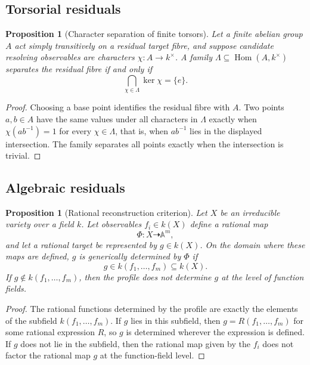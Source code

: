 \documentclass[11pt]{article}
\newtheorem{proposition}[theorem]{Proposition}
\theoremstyle{definition}
\theoremstyle{remark}
\begin{document}
\subsection{Torsorial residuals}

\begin{proposition}[Character separation of finite torsors]
Let a finite abelian group \(A\) act simply transitively on a residual target fibre, and suppose candidate resolving observables are characters \(\chi:A\to k^\times\).  A family \(\Lambda\subseteq \operatorname{Hom}(A,k^\times)\) separates the residual fibre if and only if
\[
\bigcap_{\chi\in\Lambda}\ker\chi=\{e\}.
\]
\end{proposition}

\begin{proof}
Choosing a base point identifies the residual fibre with \(A\).  Two points \(a,b\in A\) have the same values under all characters in \(\Lambda\) exactly when \(\chi(a b^{-1})=1\) for every \(\chi\in\Lambda\), that is, when \(a b^{-1}\) lies in the displayed intersection.  The family separates all points exactly when the intersection is trivial.
\end{proof}

\subsection{Algebraic residuals}

\begin{proposition}[Rational reconstruction criterion]
Let \(X\) be an irreducible variety over a field \(k\).  Let observables \(f_i\in k(X)\) define a rational map
\[
\Phi:X\dashrightarrow \mathbb A^m,
\]
and let a rational target be represented by \(g\in k(X)\).  On the domain where these maps are defined, \(g\) is generically determined by \(\Phi\) if
\[
g\in k(f_1,\ldots,f_m)\subseteq k(X).
\]
If \(g\notin k(f_1,\ldots,f_m)\), then the profile does not determine \(g\) at the level of function fields.
\end{proposition}

\begin{proof}
The rational functions determined by the profile are exactly the elements of the subfield \(k(f_1,\ldots,f_m)\).  If \(g\) lies in this subfield, then \(g=R(f_1,\ldots,f_m)\) for some rational expression \(R\), so \(g\) is determined wherever the expression is defined.  If \(g\) does not lie in the subfield, then the rational map given by the \(f_i\) does not factor the rational map \(g\) at the function-field level.
\end{proof}
\end{document}
